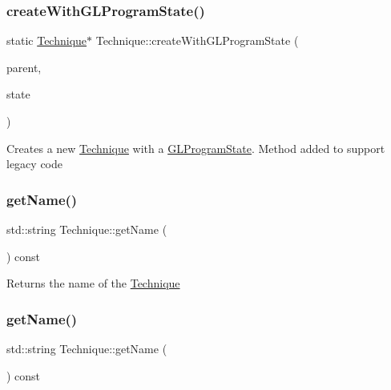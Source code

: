 \subsubsection{\texorpdfstring{create\+With\+G\+L\+Program\+State()}{createWithGLProgramState()}\hspace{0.1cm}{\footnotesize\ttfamily [2/2]}}
{\footnotesize\ttfamily static \hyperlink{classTechnique}{Technique}$\ast$ Technique\+::create\+With\+G\+L\+Program\+State (\begin{DoxyParamCaption}\item[{\hyperlink{classMaterial}{Material} $\ast$}]{parent,  }\item[{\hyperlink{classGLProgramState}{G\+L\+Program\+State} $\ast$}]{state }\end{DoxyParamCaption})\hspace{0.3cm}{\ttfamily [static]}}

Creates a new \hyperlink{classTechnique}{Technique} with a \hyperlink{classGLProgramState}{G\+L\+Program\+State}. Method added to support legacy code \mbox{\label{classTechnique_a910aded3e0c8f247af9d113b7fbd594c}} 
\subsubsection{\texorpdfstring{get\+Name()}{getName()}\hspace{0.1cm}{\footnotesize\ttfamily [1/2]}}
{\footnotesize\ttfamily std\+::string Technique\+::get\+Name (\begin{DoxyParamCaption}{ }\end{DoxyParamCaption}) const}

Returns the name of the \hyperlink{classTechnique}{Technique} \mbox{\label{classTechnique_a910aded3e0c8f247af9d113b7fbd594c}} 
\subsubsection{\texorpdfstring{get\+Name()}{getName()}\hspace{0.1cm}{\footnotesize\ttfamily [2/2]}}
{\footnotesize\ttfamily std\+::string Technique\+::get\+Name (\begin{DoxyParamCaption}{ }\end{DoxyParamCaption}) const}

